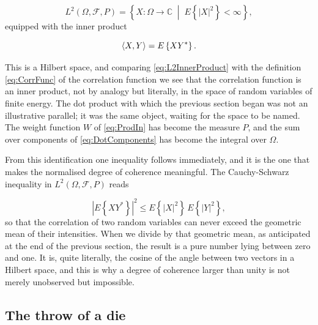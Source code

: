 		\begin{equation}\label{eq:L2Omega}
			L^{2}(\Omega,\mathcal{F},P) = \left\{X : \Omega\to\mathbb{C} \;\middle|\; E\left\{|X|^{2}\right\}<\infty\right\},
		\end{equation}
		equipped with the inner product

		\begin{equation}\label{eq:L2InnerProduct}
			\braket{X,Y} = E\left\{XY^{*}\right\}.
		\end{equation}

		This is a Hilbert space, and comparing \eqref{eq:L2InnerProduct} with the definition
		\eqref{eq:CorrFunc} of the correlation function we see that the correlation
		function is an inner product, not by analogy but literally, in the space of random
		variables of finite energy. The dot product with which the previous section began was
		not an illustrative parallel; it was the same object, waiting for the space to be named.
		The weight function $W$ of \eqref{eq:ProdIn} has become the measure $P$, and the sum
		over components of \eqref{eq:DotComponents} has become the integral over $\Omega$.

		From this identification one inequality follows immediately, and it is the one that
		makes the normalised degree of coherence meaningful. The Cauchy-Schwarz inequality in
		$L^{2}(\Omega,\mathcal{F},P)$ reads

		\begin{equation}\label{eq:CauchySchwarzProb}
			\left|E\left\{XY^{*}\right\}\right|^{2} \leq E\left\{|X|^{2}\right\}\,E\left\{|Y|^{2}\right\},
		\end{equation}
		so that the correlation of two random variables can never exceed the geometric mean of
		their intensities. When we divide by that geometric mean, as anticipated at the end of
		the previous section, the result is a pure number lying between zero and one. It is,
		quite literally, the cosine of the angle between two vectors in a Hilbert space, and
		this is why a degree of coherence larger than unity is not merely unobserved but
		impossible.

	\subsection{The throw of a die}

